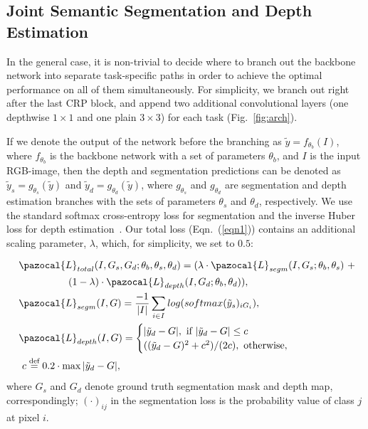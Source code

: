 \documentclass[letterpaper, 10 pt, conference]{ieeeconf}
\begin{document}
\subsection{Joint Semantic Segmentation and Depth Estimation}
In the general case, it is non-trivial to decide where to branch out the backbone network into separate task-specific paths in order to achieve the optimal performance on all of them simultaneously. For simplicity, we branch out right after the last CRP block, and append two additional convolutional layers (one depthwise $1\times1$ and one plain $3\times3$) for each task (Fig.~\ref{fig:arch}).

If we denote the output of the network before the branching as $\tilde{y}=f_{\theta_{b}}{(I)}$, where $f_{\theta_{b}}$ is the backbone network with a set of parameters $\theta_{b}$, and $I$ is the input RGB-image, then the depth and segmentation predictions can be denoted as $\tilde{y}_{s}=g_{\theta_{s}}{(\tilde{y})}$ and $\tilde{y}_{d}=g_{\theta_{d}}{(\tilde{y})}$, where $g_{\theta_{s}}$ and $g_{\theta_{d}}$ are segmentation and depth estimation branches with the sets of parameters $\theta_{s}$ and $\theta_{d}$, respectively. We use the standard softmax cross-entropy loss for segmentation and the inverse Huber loss for depth estimation~\cite{Laina2016}. Our total loss (Eqn.~(\ref{eqn1})) contains an additional scaling parameter, $\lambda$, which, for simplicity, we set to $0.5$:


\setlength{\arraycolsep}{0.0em}
\begin{align}
\begin{split}
\label{eqn1}
&\pazocal{L}_{total}(I, G_{s}, G_{d}; \theta_{b}, \theta_{s}, \theta_{d}) = (\lambda \cdot \pazocal{L}_{segm}(I, G_{s}; \theta_{b}, \theta_{s})~ + \\
& ~~~~~~~~~~~~~~~ (1 - \lambda) \cdot \pazocal{L}_{depth}(I, G_{d}; \theta_{b}, \theta_{d})),\\
&\pazocal{L}_{segm}(I, G)=\frac{-1}{|I|}\sum_{i\in{I}}log(softmax(\tilde{y}_{s})_{iG_{i}}), \\
\
&\pazocal{L}_{depth}(I, G)= 
\begin{cases}
|\tilde{y}_{d} - G|,~\text{if}~|\tilde{y}_{d} - G| \leq c\\
((\tilde{y}_{d} - G)^{2} + c^{2}) / (2c), ~ \text{otherwise},\\
\end{cases}
\\
&~c\stackrel{\text{def}}{=}0.2 \cdot \max{|\tilde{y}_{d} - G|},\\
\end{split}
\setlength{\arraycolsep}{5pt}
\end{align}
where $G_{s}$ and $G_{d}$ denote ground truth segmentation mask and depth map, correspondingly; $(\cdot)_{ij}$ in the segmentation loss is the probability value of class $j$ at pixel $i$.
\end{document}
